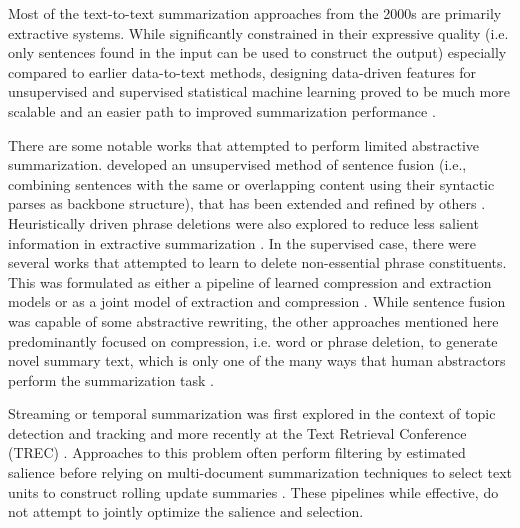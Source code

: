 Most of the text-to-text summarization approaches from the 2000s are primarily
extractive systems.  While significantly constrained in their expressive
quality (i.e. only sentences found in the input can be used to construct the
output) especially compared to earlier data-to-text methods, designing
data-driven features for unsupervised and supervised statistical machine
learning proved to be much more scalable and an easier path to improved
summarization performance \citep{nenkova2011}. 
 
There are some notable works that attempted to perform limited abstractive
summarization. \cite{barzilay2005}  developed an unsupervised method of
sentence fusion (i.e., combining sentences with the same or overlapping
content using their syntactic parses as backbone structure), that has been
extended and  refined by others \citep{marsi2005,filippova2008}. Heuristically
driven phrase deletions were also explored to reduce less salient information
in extractive summarization \citep{jing2000,zajic2007}.  In the supervised
case, there were several works that attempted to learn to  delete
non-essential phrase constituents.  This was formulated as either a pipeline
of learned compression and extraction models \citep{wang2013} or as a joint
model of extraction and compression \citep{martins2009,bergkirkpatrick2011}.
While sentence fusion was capable of some abstractive rewriting, the other
approaches mentioned here predominantly focused on compression, i.e. word or
phrase deletion, to generate novel summary text, which is only one of the many
ways that human abstractors perform the summarization task \citep{jing2000b}.

Streaming or temporal summarization was first explored in the context of topic
detection and tracking \citep{khandelwal2001,allan2001} and more recently at
the Text Retrieval Conference (TREC) \citep{aslam2013}. Approaches to this
problem often perform filtering by estimated salience before relying on
multi-document summarization techniques to select text units to construct
rolling update summaries \citep{guo2013,mccreadie2014}. These pipelines while
effective, do not attempt to jointly optimize the salience and selection.
